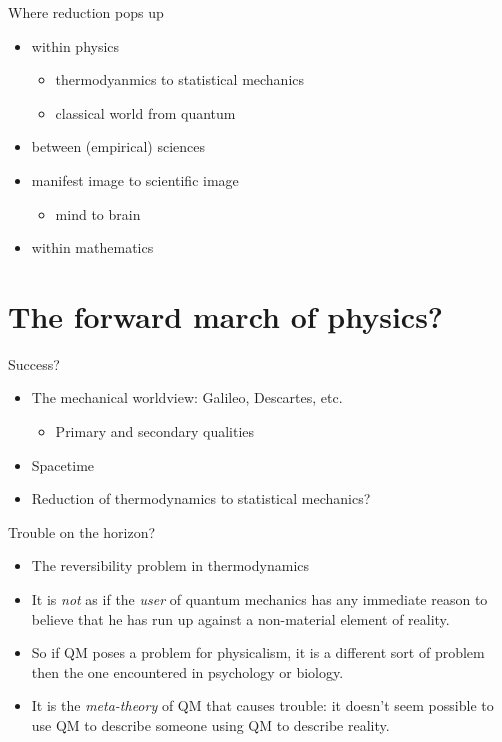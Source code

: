 \documentclass[fleqn]{beamer}
\begin{document}

\begin{frame}{Where reduction pops up}

  \begin{itemize}
  \item within physics
    \begin{itemize}
    \item thermodyanmics to statistical mechanics
    \item classical world from quantum 
    \end{itemize}
  \item between (empirical) sciences
  \item manifest image to scientific image
    \begin{itemize}
    \item mind to brain
    \end{itemize}
  \item within mathematics
  \end{itemize}

\end{frame}  


\section{The forward march of physics?}

\begin{frame}{Success?}

  \begin{itemize}
  \item The mechanical worldview: Galileo, Descartes, etc.
    \begin{itemize}
    \item Primary and secondary qualities
    \end{itemize}
  \item Spacetime
  \item Reduction of thermodynamics to statistical mechanics?
  \end{itemize}

\end{frame}


\begin{frame}{Trouble on the horizon?}

  \begin{itemize}
  \item The reversibility problem in thermodynamics  
  \item It is \emph{not} as if the \emph{user} of quantum mechanics
    has any immediate reason to believe that he has run up against a
    non-material element of reality.
  \item So if QM poses a problem for physicalism, it is a different
    sort of problem then the one encountered in psychology or biology.
  \item It is the \emph{meta-theory} of QM that causes trouble: it
    doesn't seem possible to use QM to describe someone using QM to
    describe reality.
  \end{itemize}

\end{frame}
\end{document}
